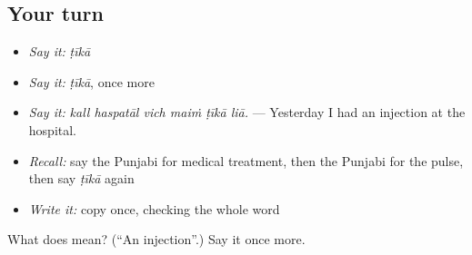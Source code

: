 \subsection*{Your turn}
\begin{itemize}
\raggedright
  \item \emph{Say it:} \emph{ṭīkā}
  \item \emph{Say it:} \emph{ṭīkā}, once more
  \item \emph{Say it:} \emph{kall haspatāl vich maiṁ ṭīkā liā.} — Yesterday I had an injection at the hospital.
  \item \emph{Recall:} say the Punjabi for medical treatment, then the Punjabi for the pulse, then say \emph{ṭīkā} again
  \item \emph{Write it:} copy \textbf{} once, checking the whole word
\end{itemize}

\begin{tcolorbox}[breakable,colback=teal!4,colframe=teal!35!black,title={Before you move on}]
What does  mean? (\textquotedblleft{}An injection\textquotedblright{}.) Say it once more.
\end{tcolorbox}
